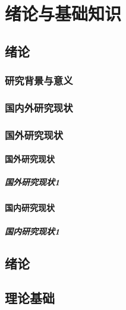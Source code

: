 \documentclass{USTBBook}
\begin{document}
\frontmatter

\setcounter{page}{0}
\cleardoublepage
{}

\tableofcontents

\mainmatter

\part{绪论与基础知识}

\chapter{绪论}
\zhlipsum[1]

\section{研究背景与意义}
\zhlipsum[2]

\zhlipsum[6-7]

\section{国内外研究现状}
\zhlipsum[3-5]

\section{国外研究现状}
\subsection{国外研究现状}
\subsubsection{国外研究现状1}
\zhlipsum[4]

\subsection{国内研究现状}
\subsubsection{国内研究现状1}
\zhlipsum[5]

\chapter{绪论}
\zhlipsum[1]

\chapter{理论基础}
\zhlipsum[6]
\end{document}
